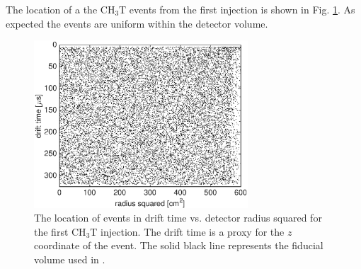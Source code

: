 The location of a the CH$_3$T events from the first injection is shown in Fig. \ref{fig:event_location}. As expected the events are uniform within the detector volume.
 
\begin{figure}[h!]\centering
\includegraphics[width=80mm]{fig/rz_scatter.eps}
\caption{The location of events in drift time vs. detector radius squared for the first CH$_3$T injection. The drift time is a proxy for the $z$ coordinate of the event. The solid black line represents the fiducial volume used in \cite{lux-prl}. }
\label{fig:event_location}
\end{figure}





